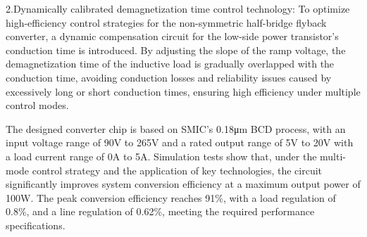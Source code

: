 2.Dynamically calibrated demagnetization time control technology: To optimize high-efficiency control strategies for the non-symmetric half-bridge flyback converter, a dynamic compensation circuit for the low-side power transistor's conduction time is introduced. By adjusting the slope of the ramp voltage, the demagnetization time of the inductive load is gradually overlapped with the conduction time, avoiding conduction losses and reliability issues caused by excessively long or short conduction times, ensuring high efficiency under multiple control modes.

The designed converter chip is based on SMIC's 0.18μm BCD process, with an input voltage range of 90V to 265V and a rated output range of 5V to 20V with a load current range of 0A to 5A. Simulation tests show that, under the multi-mode control strategy and the application of key technologies, the circuit significantly improves system conversion efficiency at a maximum output power of 100W. The peak conversion efficiency reaches 91\%, with a load regulation of 0.8\%, and a line regulation of 0.62\%, meeting the required performance specifications.